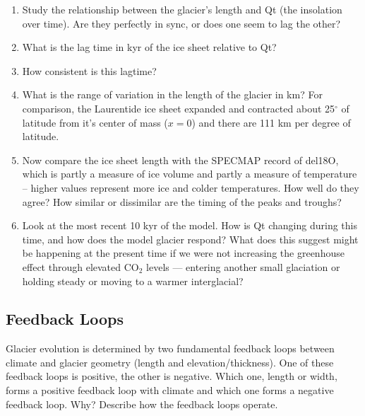\documentclass[11pt,letterpaper]{article}
\begin{document}
\begin{enumerate}[label=(\alph*)]
\item Study the relationship between the glacier’s length and Qt (the insolation over time).  Are they perfectly in sync, or does one seem to lag the other?

\item What is the lag time in kyr of the ice sheet relative to Qt?

\item How consistent is this lagtime?

\item What is the range of variation in the length of the glacier in km? For comparison, the Laurentide ice sheet expanded and contracted about 25$^\circ$ of latitude from it's center of mass ($x=0$) and there are 111 km per degree of latitude.

\item Now compare the ice sheet length with the SPECMAP record of del18O, which is partly a measure of ice volume and partly a measure of temperature -- higher values represent more ice and colder temperatures.  How well do they agree?  How similar or dissimilar are the timing of the peaks and troughs?

\item Look at the most recent 10 kyr of the model.  How is Qt changing during this time, and how does the model glacier respond?  What does this suggest might be happening at the present time if we were not increasing the greenhouse effect through elevated CO$_2$ levels --- entering another small glaciation or holding steady or moving to a warmer interglacial?
\end{enumerate}

\subsection{Feedback Loops}
Glacier evolution is determined by two fundamental feedback loops between climate and glacier geometry (length and elevation/thickness). One of these feedback loops is positive, the other is negative. Which one, length or width, forms a positive feedback loop with climate and which one forms a negative feedback loop. Why? Describe how the feedback loops operate.
\end{document}
